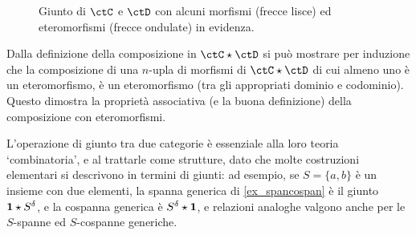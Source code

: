 \begin{definition}
\begin{figure}[h]
\begin{center}
			\caption{Giunto di \(\ctC\) e \(\ctD\) con alcuni morfismi (frecce lisce) ed eteromorfismi (frecce ondulate) in evidenza.}
			\label{fig_giunto}
		\end{center}
	\end{figure}
\end{definition}
Dalla definizione della composizione in \(\ctC\star\ctD\) si può mostrare per induzione che la composizione di una \(n\)-upla di morfismi di \(\ctC\star\ctD\) di cui almeno uno è un eteromorfismo, è un eteromorfismo (tra gli appropriati dominio e codominio). Questo dimostra la proprietà associativa (e la buona definizione) della composizione con eteromorfismi.

L'operazione di giunto tra due categorie è essenziale alla loro teoria `combinatoria', e al trattarle come strutture, dato che molte costruzioni elementari si descrivono in termini di giunti: ad esempio, se \(S=\{a,b\}\) è un insieme con due elementi, la spanna generica di \ref{ex_spancospan} è il giunto \(\mathbf{1}\star S^\delta\), e la cospanna generica è \(S^\delta\star\mathbf{1}\), e relazioni analoghe valgono anche per le \(S\)-spanne ed \(S\)-cospanne generiche.

